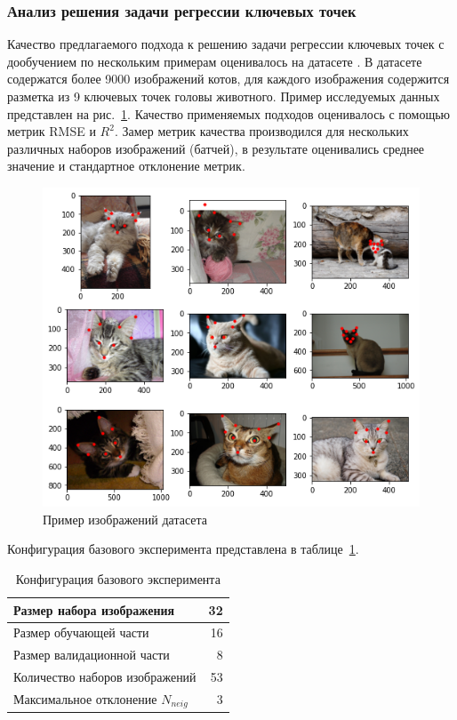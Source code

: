 \documentclass[a4paper,14pt]{article}
\begin{document}
    \subsubsection{Анализ решения задачи регрессии ключевых точек} \label{kpoints_exp}

    Качество предлагаемого подхода к решению задачи регрессии ключевых точек с дообучением по нескольким примерам оценивалось на датасете \cite{cat_dataset}.
    В датасете содержатся более 9000 изображений котов, для каждого изображения содержится разметка из 9 ключевых точек головы животного.
    Пример исследуемых данных представлен на рис.~\ref{fig:example_cat_dataset}.
    Качество применяемых подходов оценивалось с помощью метрик RMSE и $R^2$.
    Замер метрик качества производился для нескольких различных наборов изображений (батчей), в результате оценивались среднее значение и стандартное отклонение метрик.

    \begin{figure}[H]
        \centering
        \includegraphics[width=0.6\linewidth]{images/example_cat_dataset}
        \caption{Пример изображений датасета \cite{cat_dataset}}
        \label{fig:example_cat_dataset}
    \end{figure}

    Конфигурация базового эксперимента представлена в таблице~\ref{tab:base_config}.
    \begin{center}
        \begin{table}[H]
            \centering
            \caption{Конфигурация базового эксперимента}
            \label{tab:base_config}
            \bgroup
            \def\arraystretch{1.5}
            \begin{tabular}{| l | r |}
                \hline
                Размер набора изображения         & 32 \\ \hline
                Размер обучающей части            & 16 \\ \hline
                Размер валидационной части        & 8  \\ \hline
                Количество наборов изображений    & 53 \\ \hline
                Максимальное отклонение  $N_{neig}$ & 3  \\
                \hline
            \end{tabular}
            \egroup
        \end{table}
    \end{center}
\end{document}
